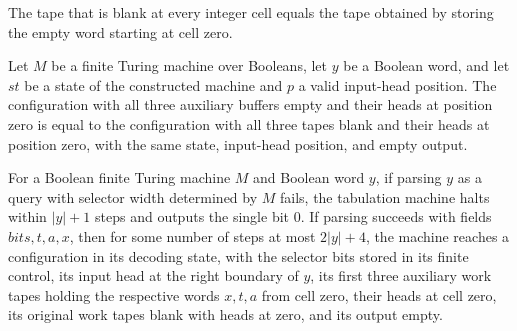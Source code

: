 \begin{theorem}
\label{Complexity.Meyer.bl_eq}
\leanok
{}
The tape that is blank at every integer cell equals the tape obtained by storing the
empty word starting at cell zero.
\end{theorem}

\begin{theorem}
\label{Complexity.Meyer.pcfg_nil}
\leanok
{}
Let $M$ be a finite Turing machine over Booleans, let $y$ be a Boolean word, and let
$st$ be a state of the constructed machine and $p$ a valid input-head position. The
configuration with all three auxiliary buffers empty and their heads at position zero is
equal to the configuration with all three tapes blank and their heads at position zero,
with the same state, input-head position, and empty output.
\end{theorem}

\begin{theorem}
\label{Complexity.Meyer.tabTM_setup}
\leanok
{}
For a Boolean finite Turing machine $M$ and Boolean word $y$, if parsing $y$ as a query
with selector width determined by $M$ fails, the tabulation machine halts within $|y|+1$
steps and outputs the single bit $0$. If parsing succeeds with fields $bits,t,a,x$, then
for some number of steps at most $2|y|+4$, the machine reaches a configuration in its
decoding state, with the selector bits stored in its finite control, its input head at
the right boundary of $y$, its first three auxiliary work tapes holding the respective
words $x,t,a$ from cell zero, their heads at cell zero, its original work tapes blank
with heads at zero, and its output empty.
\end{theorem}
